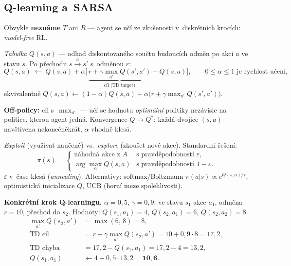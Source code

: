\documentclass[11pt,a4paper]{article}
\theoremstyle{definition}
\begin{document}
\subsection{Q-learning a~SARSA}

Obvykle \textbf{neznáme} $T$ ani $R$ --- agent se učí ze zkušenosti v~diskrétních krocích:
\emph{model-free} RL.

\begin{defbox}
\emph{Tabulka} $Q(s,a)$ --- odhad diskontovaného součtu budoucích odměn po akci $a$ ve stavu
$s$. Po přechodu $s \xrightarrow{a} s'$ s~odměnou $r$:
\[
Q(s,a) \;\leftarrow\; Q(s,a) + \alpha\Big[\, \underbrace{r + \gamma \max_{a'} Q(s',a')}
_{\text{cíl (TD target)}} - Q(s,a) \Big],
\qquad 0 \le \alpha \le 1 \text{ je rychlost učení,}
\]
ekvivalentně $Q(s,a) \leftarrow (1-\alpha)Q(s,a) + \alpha\big(r + \gamma\max_{a'}Q(s',a')\big)$.

\textbf{Off-policy:} cíl s~$\max_{a'}$ --- učí se hodnotu \emph{optimální} politiky nezávisle
na politice, kterou agent jedná. Konvergence $Q \to Q^*$: každá dvojice $(s,a)$ navštívena
nekonečněkrát, $\alpha$ vhodně klesá.
\end{defbox}

\begin{defbox}
\emph{Exploit} (využívat naučené) vs.\ \emph{explore} (zkoušet nové akce). Standardní řešení:
\[
\pi(s) = \begin{cases}
\text{náhodná akce z } A & \text{s pravděpodobností } \varepsilon,\\
\arg\max_a Q(s,a) & \text{s pravděpodobností } 1-\varepsilon .
\end{cases}
\]
$\varepsilon$ v~čase klesá (\emph{annealing}). Alternativy: softmax/Boltzmann
$\pi(a|s) \propto e^{Q(s,a)/\tau}$, optimistická inicializace $Q$, UCB (horní meze
spolehlivosti).
\end{defbox}

\medskip
\noindent\textbf{Konkrétní krok Q-learningu.} $\alpha = 0{,}5$, $\gamma = 0{,}9$; ve stavu
$s_1$ akce $a_1$, odměna $r = 10$, přechod do $s_2$. Hodnoty: $Q(s_1,a_1) = 4$,
$Q(s_2,a_1) = 6$, $Q(s_2,a_2) = 8$.
\begin{align*}
\max_{a'} Q(s_2,a') &= \max(6,\,8) = 8, \\
\text{TD cíl} &= r + \gamma \max_{a'} Q(s_2,a') = 10 + 0{,}9 \cdot 8 = 17{,}2, \\
\text{TD chyba} &= 17{,}2 - Q(s_1,a_1) = 17{,}2 - 4 = 13{,}2, \\
Q(s_1,a_1) &\leftarrow 4 + 0{,}5 \cdot 13{,}2 = \mathbf{10{,}6}.
\end{align*}
\end{document}
